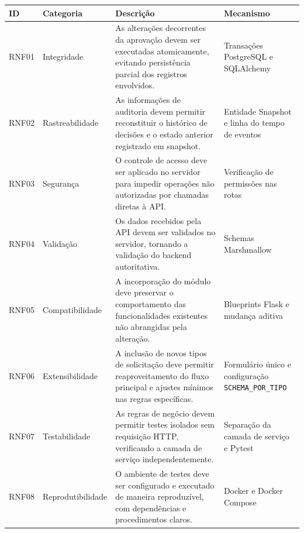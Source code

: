 \FloatBarrier
\begin{quadro}[htbp]
\centering
\caption[Requisitos não funcionais do módulo]{Requisitos não funcionais do módulo de solicitações.}
\label{qua:rnf}
\small
\setlength{\tabcolsep}{3pt}
\renewcommand{\arraystretch}{1.2}
\begin{tabularx}{\linewidth}{
    >{\raggedright\arraybackslash}p{1cm}
    >{\raggedright\arraybackslash}p{2.8cm}
    >{\raggedright\arraybackslash}X
    >{\raggedright\arraybackslash}p{3.1cm}
}
\toprule
\textbf{ID} & \textbf{Categoria} & \textbf{Descrição} & \textbf{Mecanismo} \\
\midrule
RNF01 & Integridade & As alterações decorrentes da aprovação devem ser executadas atomicamente, evitando persistência parcial dos registros envolvidos. & Transações PostgreSQL e SQLAlchemy \\
\midrule
RNF02 & Rastreabilidade & As informações de auditoria devem permitir reconstituir o histórico de decisões e o estado anterior registrado em snapshot. & Entidade Snapshot e linha do tempo de eventos \\
\midrule
RNF03 & Segurança & O controle de acesso deve ser aplicado no servidor para impedir operações não autorizadas por chamadas diretas à API. & Verificação de permissões nas rotas \\
\midrule
RNF04 & Validação & Os dados recebidos pela API devem ser validados no servidor, tornando a validação do backend autoritativa. & Schemas Marshmallow \\
\midrule
RNF05 & Compatibilidade & A incorporação do módulo deve preservar o comportamento das funcionalidades existentes não abrangidas pela alteração. & Blueprints Flask e mudança aditiva \\
\midrule
RNF06 & Extensibilidade & A inclusão de novos tipos de solicitação deve permitir reaproveitamento do fluxo principal e ajustes mínimos nas regras específicas. & Formulário único e configuração \texttt{SCHEMA\_POR\_TIPO} \\
\midrule
RNF07 & Testabilidade & As regras de negócio devem permitir testes isolados sem requisição HTTP, verificando a camada de serviço independentemente. & Separação da camada de serviço e Pytest \\
\midrule
RNF08 & Reprodutibilidade & O ambiente de testes deve ser configurado e executado de maneira reproduzível, com dependências e procedimentos claros. & Docker e Docker Compose \\
\bottomrule
\end{tabularx}
\end{quadro}
\FloatBarrier